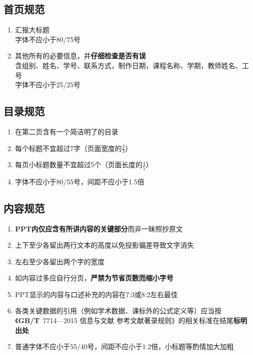 \subsection[首页规范]{首页规范}
\begin{enumerate}
    \item 汇报大标题\\
          字体不应小于80/75号
    \item 其他所有的必要信息，并\textbf{仔细检查是否有误}\\
          含组别、姓名、学号、联系方式，制作日期，课程名称、学期，教师姓名、工号\\
          字体不应小于25/25号
\end{enumerate}

\subsection[目录规范]{目录规范}
\begin{enumerate}
    \item 在第二页含有一个简洁明了的目录
    \item 每个标题不宜超过7字（页面宽度的$\frac{2}{3}$）
    \item 每页小标题数量不宜超过5个（页面长度的$\frac{4}{5}$）
    \item 字体不应小于80/55号，间距不应小于1.5倍
\end{enumerate}

\subsection[内容规范]{内容规范}
\begin{enumerate}
    \item \textbf{PPT内仅应含有所讲内容的关键部分}而非一昧照抄原文
    \item 上下至少各留出两行文本的高度以免投影偏差导致文字消失
    \item 左右至少各留出两个字的宽度
    \item 如内容过多应自行分页，\textbf{严禁为节省页数而缩小字号}
    \item PPT显示的内容与口述补充的内容在7:3或8:2左右最佳
    \item 各类关键数据的引用（例如学术数据、课标外的公式定义等）应当按\\《\textbf{GB/T}\ 7714—2015 信息与文献 参考文献著录规则》的相关标准在结尾\textbf{标明出处}
    \item 普通字体不应小于55/40号，间距不应小于1.2倍，小标题等酌情加大加粗
\end{enumerate}

